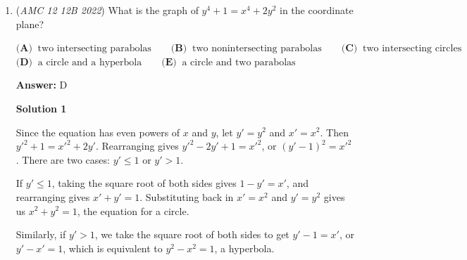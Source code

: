 \begin{enumerate}
 Trying answer choice $\textbf{(B)},$ the mode is $7,$ the median is $5,$ and the arithmetic mean is $3.$ From the arithmetic mean, we know that all the numbers have to sum to $15.$ We know three of the numbers: $\underline{\hspace{3mm}},\underline{\hspace{3mm}},5,7,7.$ This exceeds the sum of $15.$

 Now we try answer choice $\textbf{(C)}.$ The mode is $9,$ the median is $7,$ and the arithmetic mean is $5.$ From the arithmetic mean, we know that the list sums to $25.$ Three of the numbers are $\underline{\hspace{3mm}},\underline{\hspace{3mm}},7,9,9,$ which is exactly $25.$ However, our list needs positive integers, so this won't work.

 Since we were really close on answer choice $\textbf{(C)},$ we can intuitively feel that the answer is probably going to be $\textbf{(D)}.$ We can confirm this by creating a list that satisfies the problem and choose $\textbf{(D)}: 1,3,9,11,11.$

 So, our answer is $\boxed{\textbf{(D)}\ 11}.$



	\item (\textit{AMC 12 12B 2022}) What is the graph of $y^4+1=x^4+2y^2$ in the coordinate plane?


 $\textbf{(A) }\ \text{two intersecting parabolas} \qquad \textbf{(B) }\ \text{two nonintersecting parabolas} \qquad \textbf{(C) }\ \text{two intersecting circles} \qquad$
$\textbf{(D) }\ \text{a circle and a hyperbola} \qquad \textbf{(E) }\ \text{a circle and two parabolas}$

 \textbf{Answer: }D



\textbf{Solution 1}

Since the equation has even powers of $x$ and $y$, let $y'=y^2$ and $x' = x^2$. Then $y'^2 + 1 = x'^2 + 2y'$. Rearranging gives $y'^2 - 2y' + 1 = x'^2$, or $(y'-1)^2=x'^2$. There are two cases: $y' \leq 1$ or $y' > 1$.

 If $y' \leq 1$, taking the square root of both sides gives $1 - y' = x'$, and rearranging gives $x' + y' = 1$. Substituting back in $x'=x^2$ and $y'=y^2$ gives us $x^2+y^2=1$, the equation for a circle.

 Similarly, if $y' > 1$, we take the square root of both sides to get $y' - 1 = x'$, or $y' - x' = 1$, which is equivalent to $y^2 - x^2 = 1$, a hyperbola.


\end{enumerate}
